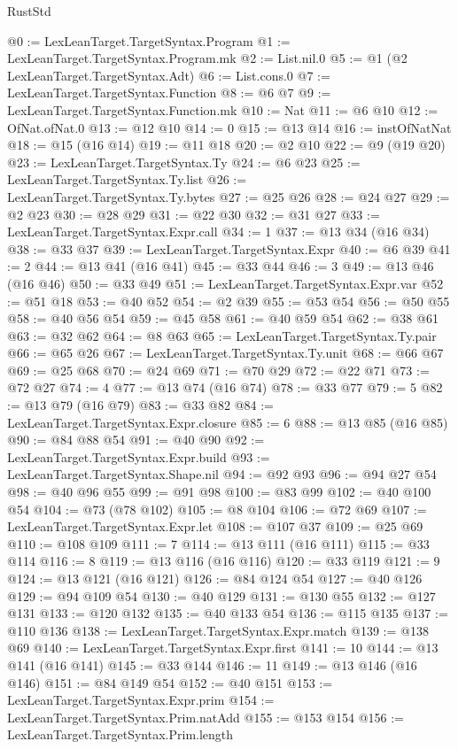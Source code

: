 \begin{lexlean}{RustStd}
\begin{coremodule}
@0 := LexLeanTarget.TargetSyntax.Program
@1 := LexLeanTarget.TargetSyntax.Program.mk
@2 := List.nil.{0}
@5 := @1 (@2 LexLeanTarget.TargetSyntax.Adt)
@6 := List.cons.{0}
@7 := LexLeanTarget.TargetSyntax.Function
@8 := @6 @7
@9 := LexLeanTarget.TargetSyntax.Function.mk
@10 := Nat
@11 := @6 @10
@12 := OfNat.ofNat.{0}
@13 := @12 @10
@14 := 0
@15 := @13 @14
@16 := instOfNatNat
@18 := @15 (@16 @14)
@19 := @11 @18
@20 := @2 @10
@22 := @9 (@19 @20)
@23 := LexLeanTarget.TargetSyntax.Ty
@24 := @6 @23
@25 := LexLeanTarget.TargetSyntax.Ty.list
@26 := LexLeanTarget.TargetSyntax.Ty.bytes
@27 := @25 @26
@28 := @24 @27
@29 := @2 @23
@30 := @28 @29
@31 := @22 @30
@32 := @31 @27
@33 := LexLeanTarget.TargetSyntax.Expr.call
@34 := 1
@37 := @13 @34 (@16 @34)
@38 := @33 @37
@39 := LexLeanTarget.TargetSyntax.Expr
@40 := @6 @39
@41 := 2
@44 := @13 @41 (@16 @41)
@45 := @33 @44
@46 := 3
@49 := @13 @46 (@16 @46)
@50 := @33 @49
@51 := LexLeanTarget.TargetSyntax.Expr.var
@52 := @51 @18
@53 := @40 @52
@54 := @2 @39
@55 := @53 @54
@56 := @50 @55
@58 := @40 @56 @54
@59 := @45 @58
@61 := @40 @59 @54
@62 := @38 @61
@63 := @32 @62
@64 := @8 @63
@65 := LexLeanTarget.TargetSyntax.Ty.pair
@66 := @65 @26
@67 := LexLeanTarget.TargetSyntax.Ty.unit
@68 := @66 @67
@69 := @25 @68
@70 := @24 @69
@71 := @70 @29
@72 := @22 @71
@73 := @72 @27
@74 := 4
@77 := @13 @74 (@16 @74)
@78 := @33 @77
@79 := 5
@82 := @13 @79 (@16 @79)
@83 := @33 @82
@84 := LexLeanTarget.TargetSyntax.Expr.closure
@85 := 6
@88 := @13 @85 (@16 @85)
@90 := @84 @88 @54
@91 := @40 @90
@92 := LexLeanTarget.TargetSyntax.Expr.build
@93 := LexLeanTarget.TargetSyntax.Shape.nil
@94 := @92 @93
@96 := @94 @27 @54
@98 := @40 @96 @55
@99 := @91 @98
@100 := @83 @99
@102 := @40 @100 @54
@104 := @73 (@78 @102)
@105 := @8 @104
@106 := @72 @69
@107 := LexLeanTarget.TargetSyntax.Expr.let
@108 := @107 @37
@109 := @25 @69
@110 := @108 @109
@111 := 7
@114 := @13 @111 (@16 @111)
@115 := @33 @114
@116 := 8
@119 := @13 @116 (@16 @116)
@120 := @33 @119
@121 := 9
@124 := @13 @121 (@16 @121)
@126 := @84 @124 @54
@127 := @40 @126
@129 := @94 @109 @54
@130 := @40 @129
@131 := @130 @55
@132 := @127 @131
@133 := @120 @132
@135 := @40 @133 @54
@136 := @115 @135
@137 := @110 @136
@138 := LexLeanTarget.TargetSyntax.Expr.match
@139 := @138 @69
@140 := LexLeanTarget.TargetSyntax.Expr.first
@141 := 10
@144 := @13 @141 (@16 @141)
@145 := @33 @144
@146 := 11
@149 := @13 @146 (@16 @146)
@151 := @84 @149 @54
@152 := @40 @151
@153 := LexLeanTarget.TargetSyntax.Expr.prim
@154 := LexLeanTarget.TargetSyntax.Prim.natAdd
@155 := @153 @154
@156 := LexLeanTarget.TargetSyntax.Prim.length

\end{coremodule}
\end{lexlean}
